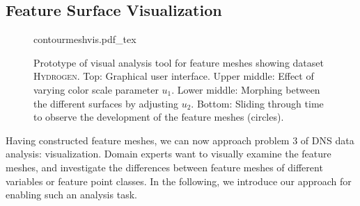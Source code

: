 \subsection{Feature Surface Visualization}
%
\begin{figure}[p]
    \centering
 	\def\svgwidth{0.5\linewidth}
		{contourmeshvis.pdf_tex}
	\caption{\label{fig_contourmeshvis}%
	Prototype of visual analysis tool for feature meshes showing dataset \textsc{Hydrogen}.
	Top: Graphical user interface. 
	Upper middle: %
	Effect of varying color scale parameter $u_1$. 
	Lower middle: %
	Morphing between the different surfaces	by adjusting $u_2$.
	Bottom: %
	Sliding through time to observe the development of the feature meshes (circles).
	 }
\end{figure}
%
Having constructed feature meshes, we can now approach problem 3 of DNS data
analysis: visualization. Domain experts want to visually examine the feature
meshes, and investigate the differences between feature meshes of different
variables or feature point classes. In the following, we introduce our approach
for enabling such an analysis task.
%
%
